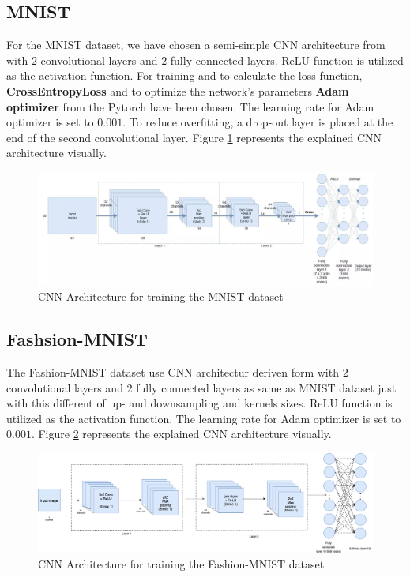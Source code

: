\subsection{MNIST}
For the MNIST dataset, we have chosen a semi-simple CNN architecture from \cite{MNIST_CNN_Architecture} with $2$
convolutional layers and $2$ fully connected layers. ReLU function is utilized as the activation
function. For training and to calculate the loss function, \textbf{CrossEntropyLoss} and
to optimize the network's parameters \textbf{Adam optimizer} \cite{adam-optimizer} from the Pytorch have been
chosen. The learning rate for Adam optimizer is set to $0.001$. To reduce overfitting, a
drop-out layer is placed at the end of the second convolutional layer. Figure \ref{fig:MNIST_CNN_Architecture} represents the explained CNN architecture visually.

\begin{figure}
  \centering
  \label{fig:MNIST_CNN_Architecture}
  \includegraphics[width=1\textwidth]{fig/MNIST-CNN-Architecture}
  \caption{CNN Architecture for training the MNIST dataset \cite{MNIST_CNN_Architecture_Image}}
\end{figure}


\subsection{Fashsion-MNIST}
The Fashion-MNIST dataset use CNN architectur deriven form \cite{TODO} with $2$
convolutional layers and $2$ fully connected layers as same as MNIST dataset just with this
different of up- and downsampling and kernels sizes. ReLU function is utilized as the activation
function. The learning rate for Adam optimizer is set to $0.001$. Figure \ref{fig:Fashion_MNIST_CNN_Architecture} represents the explained CNN architecture visually.

\begin{figure}
  \centering
  \label{fig:Fashion_MNIST_CNN_Architecture}
  \includegraphics[width=1\textwidth]{fig/Fashion-MNIST-CNN-Architecture}
  \caption{CNN Architecture for training the Fashion-MNIST dataset}
\end{figure}

